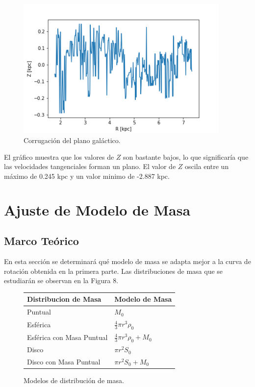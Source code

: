 \documentclass[letterpaper,oneside]{article}
\begin{document}
\begin{figure}
  \centering
  \includegraphics[height=7cm]{../graficos/corr.png}
  \caption{Corrugación del plano galáctico.}
\end{figure}

El gráfico muestra que los valores de $Z$ son bastante bajos, lo que significaría que las velocidades tangenciales forman un plano. El valor de $Z$ oscila entre un máximo de 0.245 kpc y un valor minimo de -2.887 kpc.

\section{Ajuste de Modelo de Masa}
\subsection{Marco Teórico}
En esta sección se determinará qué modelo de masa se adapta mejor a la curva de rotación obtenida en la primera parte. Las distribuciones de masa que se estudiarán se observan en la Figura 8.

\begin{figure}
    \begin{tabular}{| l | l|}
     \hline
    Distribucion de Masa      & Modelo de Masa  \\ \hline
    Puntual 	              &	$M_0$	\\
    Esférica                  &	$\frac{4}{3}\pi r^{3} \rho_0$	\\
    Esférica con Masa Puntual &	$\frac{4}{3}\pi r^{3} \rho_0 + M_0$	\\
    Disco       	          &	$\pi r^{2}S_0$	\\
    Disco con Masa Puntual    &	$\pi r^{2}S_0 + M_0$	\\
    \hline
    \end{tabular}
    \caption{Modelos de distribución de masa.}
\end{figure}
\end{document}
